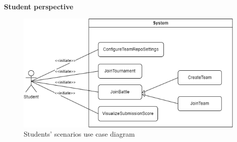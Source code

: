 \textbf{Student perspective}
\begin{figure}[H]
    \hspace{40px}
    \includegraphics[scale=0.5]{Diagrams/use_case_student.png}
    \caption{Students' scenarios use case diagram}
\end{figure}
